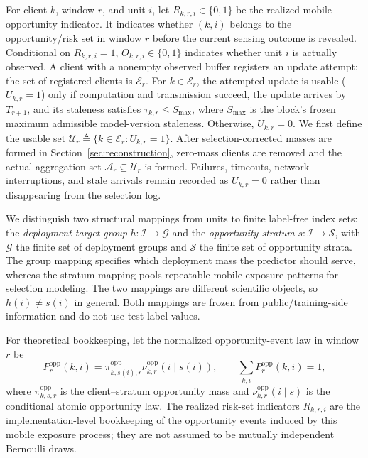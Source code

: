 \documentclass[letterpaper,journal]{IEEEtran}
\begin{document}
For client $k$, window $r$, and unit $i$, let
$R_{k,r,i}\in\{0,1\}$ be the realized mobile opportunity indicator.
It indicates whether $(k,i)$ belongs to the opportunity/risk set in
window $r$ before the current sensing outcome is revealed.
Conditional on $R_{k,r,i}=1$,
$O_{k,r,i}\in\{0,1\}$
indicates whether unit $i$ is actually observed.  A client with a
nonempty observed buffer registers an update attempt; the set of
registered clients is $\mathcal{E}_r$.  For $k\in\mathcal{E}_r$, the
attempted update is usable ($U_{k,r}=1$) only if computation and
transmission succeed, the update arrives by $T_{r+1}$, and its
staleness satisfies $\tau_{k,r}\le S_{\max}$, where $S_{\max}$ is the block's
frozen maximum admissible model-version staleness.  Otherwise,
$U_{k,r}=0$.  We first define the usable set
$\mathcal{U}_r\triangleq\{k\in\mathcal{E}_r:U_{k,r}=1\}$.
After selection-corrected masses are formed in
Section~\ref{sec:reconstruction}, zero-mass clients are removed and the
actual aggregation set $\mathcal{A}_r\subseteq\mathcal{U}_r$ is formed.
Failures, timeouts, network interruptions, and stale arrivals remain
recorded as $U_{k,r}=0$ rather than disappearing from the selection
log.

We distinguish two structural mappings from units to finite label-free index
sets: the \emph{deployment-target group} $h:\mathcal{I}\to\mathcal{G}$ and the
\emph{opportunity stratum} $s:\mathcal{I}\to\mathcal{S}$, with $\mathcal{G}$ the
finite set of deployment groups and $\mathcal{S}$ the finite set of
opportunity strata.  The group mapping specifies which deployment
mass the predictor should serve, whereas the stratum mapping pools
repeatable mobile exposure patterns for selection modeling.  The two
mappings are different scientific objects, so $h(i)\neq s(i)$ in
general.  Both mappings are frozen from public/training-side
information and do not use test-label values.

For theoretical bookkeeping, let the normalized opportunity-event law in
window $r$ be
\begin{equation}
 P_r^{\mathrm{opp}}(k,i)
 =
 \pi^{\mathrm{opp}}_{k,s(i),r}
 \nu^{\mathrm{opp}}_{k,r}(i\mid s(i)),
 \qquad
 \sum_{k,i}P_r^{\mathrm{opp}}(k,i)=1,
 \label{eq:opp_event_law}
\end{equation}
where $\pi^{\mathrm{opp}}_{k,s,r}$ is the client--stratum opportunity mass and
$\nu^{\mathrm{opp}}_{k,r}(i\mid s)$ is the conditional atomic opportunity law.
The realized risk-set indicators $R_{k,r,i}$ are the implementation-level
bookkeeping of the opportunity events induced by this mobile exposure process;
they are not assumed to be mutually independent Bernoulli draws.
\end{document}
